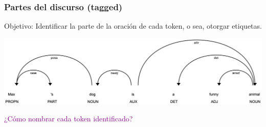 \documentclass[
10pt, %
aspectratio=169, %
]{beamer}
\begin{document}
	\begin{frame}
		
		\frametitle{Partes del discurso (tagged)}
		
		\begin{alertblock}{} 
			Objetivo: Identificar la parte de la oración de cada token, o sea, otorgar etiquetas.
		\end{alertblock}
		
		\vspace{1\baselineskip}
		\centering	
		\includegraphics[scale=0.38]{pos-tagged.png} 
		
		\vspace{3\baselineskip}
		\pause
		\textcolor{purple}{¿Cómo nombrar cada token identificado?}
		
		
	\end{frame}
	
	
\end{document}

